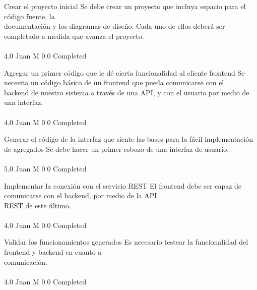		{Crear el proyecto inicial} %
		{Se debe crear un proyecto que incluya espacio para el código fuente, la\\
documentación y los diagramas de diseño. Cada uno de ellos deberá ser\\
completado a medida que avanza el proyecto.\\
\\
} %
		{4.0} %
		{Juan M} %
		{0.0} %
		{Completed} %

		{Agregar un primer código que le dé cierta funcionalidad al cliente frontend} %
		{Se necesita un código básico de un frontend que pueda comunicarse con el\\
backend de nuestro sistema a través de una API, y con el usuario por medio de\\
una interfaz.\\
\\
} %
		{4.0} %
		{Juan M} %
		{0.0} %
		{Completed} %

		{Generar el código de la interfaz que siente las bases para la fácil implementación de agregados} %
		{Se debe hacer un primer esbozo de una interfaz de usuario.\\
\\
} %
		{5.0} %
		{Juan M} %
		{0.0} %
		{Completed} %

		{Implementar la conexión con el servicio REST} %
		{El frontend debe ser capaz de comunicarse con el backend, por medio de la API\\
REST de este último.\\
\\
} %
		{4.0} %
		{Juan M} %
		{0.0} %
		{Completed} %

		{Validar los funcionamientos generados} %
		{Es necesario testear la funcionalidad del frontend y backend en cuanto a\\
comunicación.\\
\\
} %
		{4.0} %
		{Juan M} %
		{0.0} %
		{Completed} %


